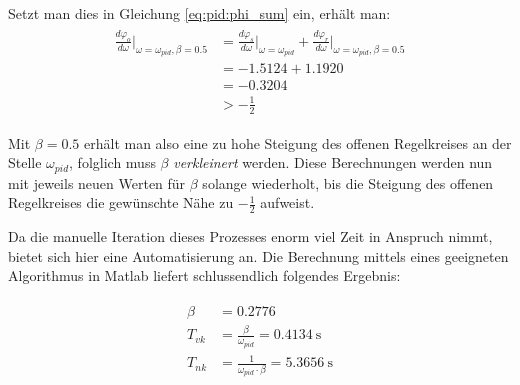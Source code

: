 Setzt man dies in Gleichung \ref{eq:pid:phi_sum} ein, erh\"alt man:
\begin{gather} \label{eq:pid:phi_sum_result_iteration_one}
    \begin{split}
    \frac{d\varphi_o}{d\omega}       \biggr \rvert_{\omega=\omega_{pid}, \beta=0.5}
        & = \frac{d\varphi_s}{d\omega} \biggr \rvert_{\omega=\omega_{pid}}
        + \frac{d\varphi_r}{d\omega} \biggr \rvert_{\omega=\omega_{pid}, \beta=0.5} \\
        & = -1.5124 + 1.1920 \\
        & = -0.3204 \\
        & > -\frac{1}{2}
    \end{split}
\end{gather}

Mit  $\beta  = 0.5$  erh\"alt  man  also eine  zu  hohe  Steigung des  offenen
Regelkreises   an    der   Stelle  $\omega_{pid}$,   folglich   muss   $\beta$
\emph{verkleinert} werden.   Diese Berechnungen  werden nun mit  jeweils neuen
Werten  f\"ur  $\beta$  solange  wiederholt,  bis  die  Steigung  des  offenen
Regelkreises die gew\"unschte N\"ahe zu $-\frac{1}{2}$ aufweist.

Da die manuelle Iteration dieses Prozesses  enorm viel Zeit in Anspruch nimmt,
bietet  sich  hier  eine  Automatisierung  an. Die  Berechnung  mittels  eines
geeigneten Algorithmus in Matlab liefert schlussendlich folgendes Ergebnis:

\begin{gather} \label{eq:pid:beta_result}
    \begin{split}
        \beta    & = 0.2776 \\
        {T_{vk}} & = \frac{\beta}{\omega_{pid}}           = \SI{0.4134}{\second} \\
        {T_{nk}} & = \frac{1}{\omega_{pid} \cdot \beta}   = \SI{5.3656}{\second} \\
    \end{split}
\end{gather}

